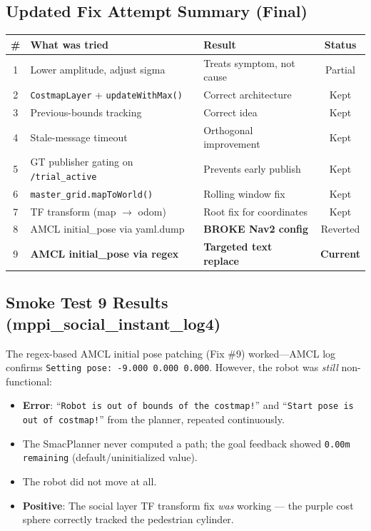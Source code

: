 \documentclass[11pt]{article}
\newcommand{\logentry}[1]{\subsection*{#1}}
\begin{document}
\logentry{Updated Fix Attempt Summary (Final)}
\begin{center}
\begin{tabular}{|c|p{5cm}|p{4cm}|c|}
\hline
\textbf{\#} & \textbf{What was tried} & \textbf{Result} & \textbf{Status} \\
\hline
1 & Lower amplitude, adjust sigma & Treats symptom, not cause & Partial \\
\hline
2 & \texttt{CostmapLayer} + \texttt{updateWithMax()} & Correct architecture & Kept \\
\hline
3 & Previous-bounds tracking & Correct idea & Kept \\
\hline
4 & Stale-message timeout & Orthogonal improvement & Kept \\
\hline
5 & GT publisher gating on \texttt{/trial\_active} & Prevents early publish & Kept \\
\hline
6 & \texttt{master\_grid.mapToWorld()} & Rolling window fix & Kept \\
\hline
7 & TF transform (map $\to$ odom) & Root fix for coordinates & Kept \\
\hline
8 & AMCL initial\_pose via yaml.dump & \textbf{BROKE Nav2 config} & Reverted \\
\hline
9 & \textbf{AMCL initial\_pose via regex} & \textbf{Targeted text replace} & \textbf{Current} \\
\hline
\end{tabular}
\end{center}

\logentry{Smoke Test 9 Results (mppi\_social\_instant\_log4)}
The regex-based AMCL initial pose patching (Fix \#9) worked---AMCL log confirms
\texttt{Setting pose: -9.000 0.000 0.000}. However, the robot was \emph{still}
non-functional:
\begin{itemize}
  \item \textbf{Error}: ``\texttt{Robot is out of bounds of the costmap!}'' and
        ``\texttt{Start pose is out of costmap!}'' from the planner, repeated
        continuously.
  \item The SmacPlanner never computed a path; the goal feedback showed
        \texttt{0.00m remaining} (default/uninitialized value).
  \item The robot did not move at all.
  \item \textbf{Positive}: The social layer TF transform fix \emph{was} working
        --- the purple cost sphere correctly tracked the pedestrian cylinder.
\end{itemize}
\end{document}
